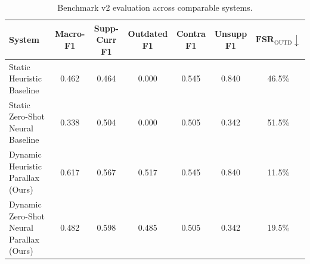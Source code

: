 \begin{table}[t]
\centering
\small
\begin{tabular}{l|c|cccc|c}
\toprule
\textbf{System} & \textbf{Macro-F1} & \textbf{Supp-Curr F1} & \textbf{Outdated F1} & \textbf{Contra F1} & \textbf{Unsupp F1} & $\mathbf{FSR}_{\text{OUTD}} \downarrow$ \\
\midrule
Static Heuristic Baseline & 0.462 & 0.464 & 0.000 & 0.545 & 0.840 & 46.5\% \\
Static Zero-Shot Neural Baseline & 0.338 & 0.504 & 0.000 & 0.505 & 0.342 & 51.5\% \\
Dynamic Heuristic Parallax (Ours) & 0.617 & 0.567 & 0.517 & 0.545 & 0.840 & 11.5\% \\
Dynamic Zero-Shot Neural Parallax (Ours) & 0.482 & 0.598 & 0.485 & 0.505 & 0.342 & 19.5\% \\
\bottomrule
\end{tabular}
\caption{Benchmark v2 evaluation across comparable systems.}
\label{tab:main_results}
\end{table}
